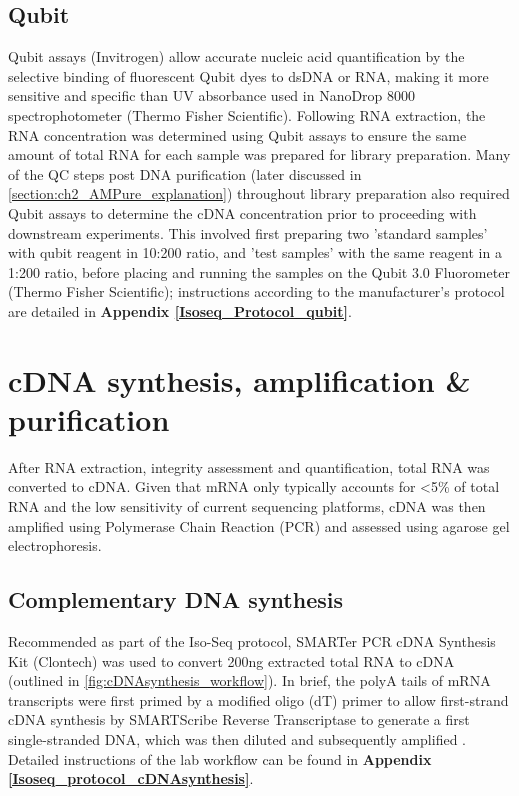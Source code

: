 \subsection{Qubit}
\label{section:ch2_qubit}   
Qubit assays (Invitrogen) allow accurate nucleic acid quantification by the selective binding of fluorescent Qubit dyes to dsDNA or RNA, making it more sensitive and specific than UV absorbance used in NanoDrop 8000 spectrophotometer (Thermo Fisher Scientific). Following RNA extraction, the RNA concentration was determined using Qubit assays to ensure the same amount of total RNA for each sample was prepared for library preparation. Many of the QC steps post DNA purification (later discussed in \cref{section:ch2_AMPure_explanation}) throughout library preparation also required Qubit assays to determine the cDNA concentration prior to proceeding with downstream experiments. This involved first preparing two 'standard samples' with qubit reagent in 10:200 ratio, and 'test samples' with the same reagent in a 1:200 ratio, before placing and running the samples on the Qubit 3.0 Fluorometer (Thermo Fisher Scientific); instructions according to the manufacturer's protocol are detailed in \textbf{Appendix  \ref{Isoseq_Protocol_qubit}}.       

\section{cDNA synthesis, amplification \& purification}
After RNA extraction, integrity assessment and quantification, total RNA was converted to cDNA. Given that mRNA only typically accounts for <5\% of total RNA and the low sensitivity of current sequencing platforms, cDNA was then amplified using Polymerase Chain Reaction (PCR) and assessed using agarose gel electrophoresis. 


\subsection{Complementary DNA synthesis}
\label{section:ch2_cDNA_synthesis_explanation} 
Recommended as part of the Iso-Seq protocol, SMARTer PCR cDNA Synthesis Kit (Clontech) was used to convert 200ng extracted total RNA to cDNA (outlined in \cref{fig:cDNAsynthesis_workflow}). In brief, the polyA tails of mRNA transcripts were first primed by a modified oligo (dT) primer to allow first-strand cDNA synthesis by SMARTScribe Reverse Transcriptase to generate a first single-stranded DNA, which was then diluted and subsequently amplified \cite{Ramskold2012}. Detailed instructions of the lab workflow can be found in \textbf{Appendix \ref{Isoseq_protocol_cDNAsynthesis}}. 


